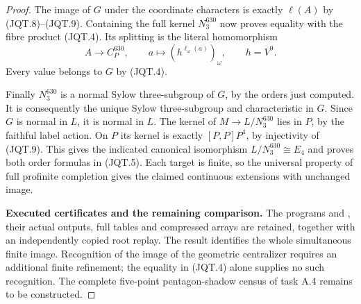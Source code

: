 \begin{proof}
The image of $G$ under the coordinate characters is
exactly $\ell(A)$ by (JQT.8)--(JQT.9).  Containing
the full kernel $N_3^{630}$ now proves equality with
the fibre product (JQT.4).  Its splitting is the
literal homomorphism
\[
 A\longrightarrow C_P^{630},\qquad
       a\longmapsto(h^{\ell_\omega(a)})_\omega,
             \qquad h=V^9.                                \tag{JQT.11}
\]
Every value belongs to $G$ by (JQT.4).

Finally $N_3^{630}$ is a normal Sylow three-subgroup of
$G$, by the orders just computed.  It is consequently
the unique Sylow three-subgroup and characteristic in
$G$.  Since $G$ is normal in $L$, it is normal in $L$.
The kernel of $M\to L/N_3^{630}$ lies in $P$,
by the faithful label action.  On $P$ its kernel is
exactly $[P,P]P^4$, by injectivity of (JQT.9).
This gives the indicated canonical isomorphism
$L/N_3^{630}\cong E_4$ and proves both order formulas
in (JQT.5).  Each target is finite, so the universal
property of full profinite completion gives the
claimed continuous extensions with unchanged image.

\par\medskip\noindent\textbf{Executed certificates and the remaining comparison.}\quad
The programs 
and , their
actual outputs, full tables and compressed arrays are
retained, together with an independently copied root
replay.  The result identifies the whole simultaneous
finite image.  Recognition of the image of the geometric
centralizer requires an additional finite refinement;
the equality in (JQT.4) alone supplies no such recognition.
The complete five-point pentagon-shadow census of task
A.4 remains to be constructed.
\end{proof}
